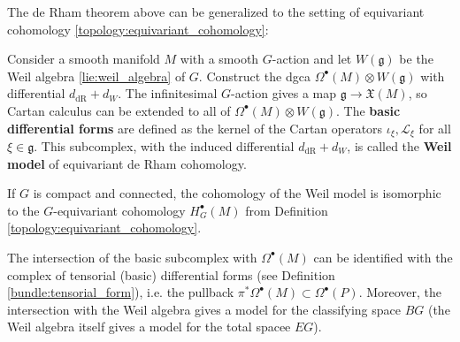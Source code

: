 
    The de Rham theorem above can be generalized to the setting of equivariant cohomology \ref{topology:equivariant_cohomology}:
    \begin{property}
        Consider a smooth manifold $M$ with a smooth $G$-action and let $W(\mathfrak{g})$ be the Weil algebra \ref{lie:weil_algebra} of $G$. Construct the dgca $\Omega^\bullet(M)\otimes W(\mathfrak{g})$ with differential $d_\mathrm{dR}+d_W$. The infinitesimal $G$-action gives a map $\mathfrak{g}\rightarrow\mathfrak{X}(M)$, so Cartan calculus can be extended to all of $\Omega^\bullet(M)\otimes W(\mathfrak{g})$. The \textbf{basic differential forms} are defined as the kernel of the Cartan operators $\iota_\xi,\mathcal{L}_\xi$ for all $\xi\in\mathfrak{g}$. This subcomplex, with the induced differential $d_\mathrm{dR}+d_W$, is called the \textbf{Weil model} of equivariant de Rham cohomology.

        If $G$ is compact and connected, the cohomology of the Weil model is isomorphic to the $G$-equivariant cohomology $H_G^\bullet(M)$ from Definition \ref{topology:equivariant_cohomology}.
    \end{property}
    \begin{property}
        The intersection of the basic subcomplex with $\Omega^\bullet(M)$ can be identified with the complex of tensorial (basic) differential forms (see Definition \ref{bundle:tensorial_form}), i.e. the pullback $\pi^*\Omega^\bullet(M)\subset\Omega^\bullet(P)$. Moreover, the intersection with the Weil algebra gives a model for the classifying space $BG$ (the Weil algebra itself gives a model for the total spacee $EG$).
    \end{property}

